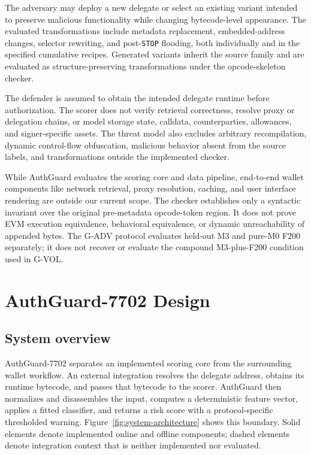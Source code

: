 \documentclass[conference]{IEEEtran}
\begin{document}
The adversary may deploy a new delegate or select an existing variant intended to preserve malicious functionality while changing bytecode-level appearance. The evaluated transformations include metadata replacement, embedded-address changes, selector rewriting, and post-\texttt{STOP} flooding, both individually and in the specified cumulative recipes. Generated variants inherit the source family and are evaluated as structure-preserving transformations under the opcode-skeleton checker.

The defender is assumed to obtain the intended delegate runtime before authorization. The scorer does not verify retrieval correctness, resolve proxy or delegation chains, or model storage state, calldata, counterparties, allowances, and signer-specific assets. The threat model also excludes arbitrary recompilation, dynamic control-flow obfuscation, malicious behavior absent from the source labels, and transformations outside the implemented checker. 

While AuthGuard evaluates the scoring core and data pipeline, end-to-end wallet components like network retrieval, proxy resolution, caching, and user interface rendering are outside our current scope. The checker establishes only a syntactic invariant over the original pre-metadata opcode-token region. It does not prove EVM execution equivalence, behavioral equivalence, or dynamic unreachability of appended bytes. The G-ADV protocol evaluates held-out M3 and pure-M0 F200 separately; it does not recover or evaluate the compound M3-plus-F200 condition used in G-VOL.

\section{AuthGuard-7702 Design}
\label{sec:design}

\subsection{System overview}

AuthGuard-7702 separates an implemented scoring core from the surrounding wallet workflow. An external integration resolves the delegate address, obtains its runtime bytecode, and passes that bytecode to the scorer. AuthGuard then normalizes and disassembles the input, computes a deterministic feature vector, applies a fitted classifier, and returns a risk score with a protocol-specific thresholded warning. Figure~\ref{fig:system-architecture} shows this boundary. Solid elements denote implemented online and offline components; dashed elements denote integration context that is neither implemented nor evaluated.
\end{document}
